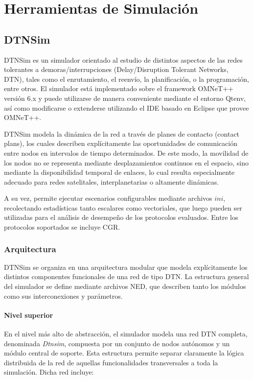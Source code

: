 \chapter{Herramientas de Simulación}

\section{DTNSim}

DTNSim es un simulador orientado al estudio de distintos aspectos de las redes tolerantes a demoras/interrupciones (Delay/Disruption Tolerant Networks, DTN), tales como el enrutamiento, el reenvío, la planificación, o la programación, entre otros. El simulador está implementado sobre el framework OMNeT++ versión 6.x y puede utilizarse de manera conveniente mediante el entorno Qtenv, así como modificarse o extenderse utilizando el IDE basado en Eclipse que provee OMNeT++.

DTNSim modela la dinámica de la red a través de planes de contacto (contact plans), los cuales describen explícitamente las oportunidades de comunicación entre nodos en intervalos de tiempo determinados. De este modo, la movilidad de los nodos no se representa mediante desplazamientos continuos en el espacio, sino mediante la disponibilidad temporal de enlaces, lo cual resulta especialmente adecuado para redes satelitales, interplanetarias o altamente dinámicas.

A su vez, permite ejecutar escenarios configurables mediante archivos $ini$, recolectando estadísticas tanto escalares como vectoriales, que luego pueden ser utilizadas para el análisis de desempeño de los protocolos evaluados. Entre los protocolos soportados se incluye CGR.

\subsection{Arquitectura}
DTNSim se organiza en una arquitectura modular que modela explícitamente los distintos componentes funcionales de una red de tipo DTN. La estructura general del simulador se define mediante archivos NED, que describen tanto los módulos como sus interconexiones y parámetros.

\subsubsection{Nivel superior}

En el nivel más alto de abstracción, el simulador modela una red DTN completa, denominada \textit{Dtnsim}, compuesta por un conjunto de nodos autónomos y un módulo central de soporte. Esta estructura permite separar claramente la lógica distribuida de la red de aquellas funcionalidades transversales a toda la simulación. Dicha red incluye:

